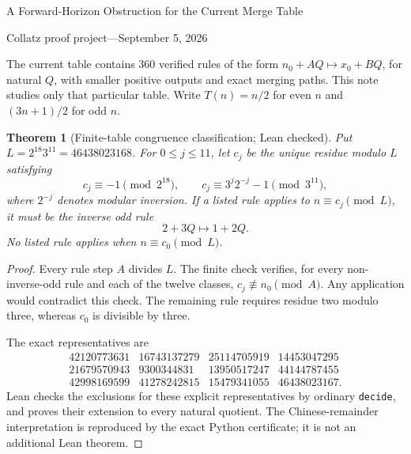 \documentclass[10pt]{article}
\newtheorem{theorem}{Theorem}
\begin{document}
\begin{center}
{\Large A Forward-Horizon Obstruction for the Current Merge Table}\par\medskip
Collatz proof project\quad---\quad September 5, 2026
\end{center}
The current table contains 360 verified rules of the form
$n_0+AQ\mapsto x_0+BQ$, for natural $Q$, with smaller positive outputs
and exact merging paths. This note studies only that particular table.
Write $T(n)=n/2$ for even $n$ and $(3n+1)/2$ for odd $n$.

\begin{theorem}[Finite-table congruence classification; Lean checked]
Put $L=2^{18}3^{11}=46438023168$. For $0\leq j\leq11$, let $c_j$
be the unique residue modulo $L$ satisfying
\[
c_j\equiv-1\pmod{2^{18}},\qquad
c_j\equiv3^j2^{-j}-1\pmod{3^{11}},
\]
where $2^{-j}$ denotes modular inversion. If a listed rule applies to
$n\equiv c_j\pmod L$, it must be the inverse odd rule
\[
2+3Q\longmapsto1+2Q.
\]
No listed rule applies when $n\equiv c_0\pmod L$.
\end{theorem}
\begin{proof}
Every rule step $A$ divides $L$. The finite check verifies, for every
non-inverse-odd rule and each of the twelve classes,
$c_j\not\equiv n_0\pmod A$. Any application would contradict this
check. The remaining rule requires residue two modulo three, whereas
$c_0$ is divisible by three.

The exact representatives are
\[
\begin{array}{rrrr}
42120773631&16743137279&25114705919&14453047295\\
21679570943&9300344831&13950517247&44144787455\\
42998169599&41278242815&15479341055&46438023167.
\end{array}
\]
Lean checks the exclusions for these explicit representatives by ordinary
\texttt{decide}, and proves their extension to every natural quotient.
The Chinese-remainder interpretation is reproduced by the exact Python
certificate; it is not an additional Lean theorem.
\end{proof}
\end{document}
